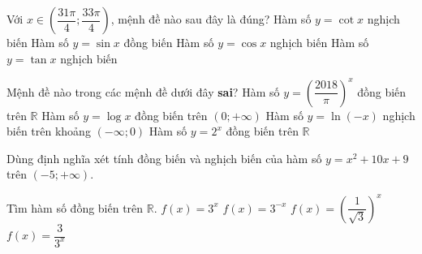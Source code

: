 \begin{ex}[c]%
	 Với $x\in \left(\dfrac{31\pi}{4};\dfrac{33\pi}{4}\right)$, mệnh đề nào sau đây là đúng?
	\choice 
		{Hàm số $y=\cot x$  nghịch biến}
		{\True Hàm số  $y=\sin x$ đồng biến}
		{Hàm số $y=\cos x$ nghịch  biến}
		{Hàm số $y=\tan  x$ nghịch biến}
\end{ex}

\begin{ex}%
	Mệnh đề nào trong các  mệnh đề dưới đây \textbf{sai}?
	 \choice
		{Hàm số  $y=\left(\dfrac{2018}{\pi}\right)^x$ đồng biến trên $\mathbb{R}$}
		 {Hàm số $y=\log x$ đồng biến trên $\left(0;+\infty\right)$}
		{\True Hàm số $y=\ln \left(- x\right)$ nghịch biến trên khoảng $\left(-  \infty; 0\right)$}
		{Hàm số $y=2^x$  đồng biến trên $\mathbb{R}$}
\end{ex}

\begin{bt}%
	Dùng định nghĩa xét tính đồng biến và nghịch biến của hàm số $y=x^2+10x+9$ trên $(-5;+\infty)$.
\end{bt}

\begin{ex}%
	Tìm hàm số đồng biến  trên $\mathbb{R}$.
	\choice 
		{\True  $f(x)=3^x$}
		{$f(x)=3^{-x}$} 
		{$f(x)=\left(\dfrac{1}{\sqrt{3}}\right)^x$} 
		{$f(x)=\dfrac{3}{3^x}$} 
\end{ex}


